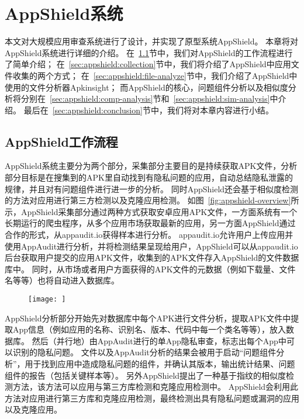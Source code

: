 \chapter{AppShield系统}
\label{chap:appshield}

本文对大规模应用审查系统进行了设计，并实现了原型系统AppShield。
本章将对AppShield系统进行详细的介绍。
在~\ref{sec:appshield:overview}节中，我们对AppShield的工作流程进行了简单介绍；
在~\ref{sec:appshield:collection}节中，我们将介绍了AppShield中应用文件收集的两个方式；
在~\ref{sec:appshield:file-analyze}节中，我们介绍了AppShield中使用的文件分析器Apkinsight；
而AppShield的核心，问题组件分析以及相似度分析将分别在~\ref{sec:appshield:comp-analysis}节和~\ref{sec:appshield:sim-analysis}中介绍。
最后在~\ref{sec:appshield:conclusion}节中，我们将对本章内容进行小结。

\section{AppShield工作流程}
\label{sec:appshield:overview}

AppShield系统主要分为两个部分，采集部分主要目的是持续获取APK文件，分析部分目标是在搜集到的APK里自动找到有隐私问题的应用，自动总结隐私泄露的规律，并且对有问题组件进行进一步的分析。
同时AppShield还会基于相似度检测的方法对应用进行第三方检测以及克隆应用检测。
如图~\ref{fig:appshield-overview}所示，AppShield采集部分通过两种方式获取安卓应用APK文件，一方面系统有一个长期运行的爬虫程序，从多个应用市场获取最新的应用，另一方面AppShield通过合作的形式，从appaudit.io获得样本进行分析。
appaudit.io允许用户上传应用并使用AppAudit进行分析，并将检测结果呈现给用户，AppShield可以从appaudit.io后台获取用户提交的应用APK文件，收集到的APK文件存入AppShield的文件数据库中。
同时，从市场或者用户方面获得的APK文件的元数据（例如下载量、文件名等等）也将自动进入数据库。

\begin{figure}
	\centering
	\texttt{[image: ]}
\end{figure}

AppShield分析部分开始先对数据库中每个APK进行文件分析，提取APK文件中提取App信息（例如应用的名称、识别名、版本、代码中每一个类名等等），放入数据库。
然后（并行地）由AppAudit进行的单App隐私审查，标志出每个App中可以识别的隐私问题。
文件以及AppAudit分析的结果会被用于启动“问题组件分析”，用于找到应用中造成隐私问题的组件，并确认其版本，输出统计结果、问题组件的报告（包括关键样本等）。
另外AppShield提出了一种基于指纹的相似度检测方法，该方法可以应用与第三方库检测和克隆应用检测中。
AppShield会利用此方法对应用进行第三方库和克隆应用检测，最终检测出具有隐私问题或漏洞的应用以及克隆应用。


